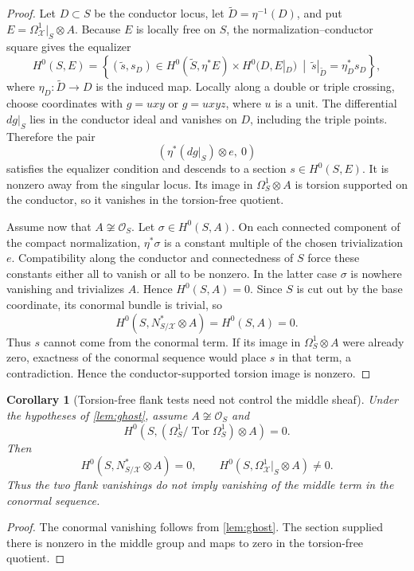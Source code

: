 \documentclass[11pt,reqno]{amsart}
\numberwithin{equation}{section}
\newcommand{\Tor}{\operatorname{Tor}}
\newtheorem{corollary}[corollary]{Corollary}
\theoremstyle{definition}
\begin{document}
\begin{proof}
Let $D\subset S$ be the conductor locus, let $\widetilde D=\eta^{-1}(D)$, and put $E=\Omega^1_{\mathcal X}|_S\otimes A$. Because $E$ is locally free on $S$, the normalization--conductor square gives the equalizer
\[
H^0(S,E)=
\left\{
(\widetilde s,s_D)\in H^0(\widetilde S,\eta^*E)\times H^0(D,E|_D)
\ \middle|\
\widetilde s|_{\widetilde D}=\eta_D^*s_D
\right\},
\]
where $\eta_D:\widetilde D\to D$ is the induced map. Locally along a double or triple crossing, choose coordinates with $g=uxy$ or $g=uxyz$, where $u$ is a unit. The differential $dg|_S$ lies in the conductor ideal and vanishes on $D$, including the triple points. Therefore the pair
\[
\left(\eta^*(dg|_S)\otimes e,\ 0\right)
\]
satisfies the equalizer condition and descends to a section $s\in H^0(S,E)$. It is nonzero away from the singular locus. Its image in $\Omega_S^1\otimes A$ is torsion supported on the conductor, so it vanishes in the torsion-free quotient.

Assume now that $A\not\cong\mathcal O_S$. Let $\sigma\in H^0(S,A)$. On each connected component of the compact normalization, $\eta^*\sigma$ is a constant multiple of the chosen trivialization $e$. Compatibility along the conductor and connectedness of $S$ force these constants either all to vanish or all to be nonzero. In the latter case $\sigma$ is nowhere vanishing and trivializes $A$. Hence $H^0(S,A)=0$. Since $S$ is cut out by the base coordinate, its conormal bundle is trivial, so
\[
H^0(S,N^*_{S/\mathcal X}\otimes A)=H^0(S,A)=0.
\]
Thus $s$ cannot come from the conormal term. If its image in $\Omega_S^1\otimes A$ were already zero, exactness of the conormal sequence would place $s$ in that term, a contradiction. Hence the conductor-supported torsion image is nonzero.
\end{proof}

\begin{corollary}[Torsion-free flank tests need not control the middle sheaf]\label{cor:ghost-flanks}
Under the hypotheses of \cref{lem:ghost}, assume $A\not\cong\mathcal O_S$ and
\[
H^0\!\left(S,(\Omega_S^1/\Tor\Omega_S^1)\otimes A\right)=0.
\]
Then
\[
H^0(S,N^*_{S/\mathcal X}\otimes A)=0,
\qquad
H^0(S,\Omega_{\mathcal X}^1|_S\otimes A)\ne0.
\]
Thus the two flank vanishings do not imply vanishing of the middle term in the conormal sequence.
\end{corollary}

\begin{proof}
The conormal vanishing follows from \cref{lem:ghost}. The section supplied there is nonzero in the middle group and maps to zero in the torsion-free quotient.
\end{proof}
\end{document}
